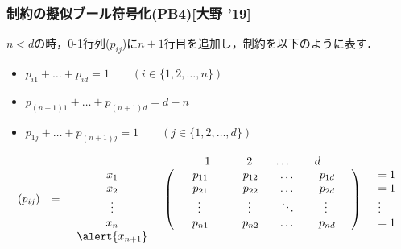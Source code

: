 \begin{frame}
    \frametitle{{\alldiff}制約の擬似ブール符号化(PB4)[大野 '19]}
    \begin{exampleblock}{}
        $n<d$の時，0-1行列($p_{ij}$)に$n+1$行目を追加し，{\alldifferent}制約を以下のように表す．
        \begin{itemize}
            \item $p_{i1} + \dots + p_{id} = 1 \qquad (i \in \{1,2,\ldots,n\})$
            \item $p_{(n+1)1} + \dots + p_{(n+1)d} = d-n$
            \item $p_{1j} + \dots + p_{(n+1)j} = 1 \qquad (j \in \{1,2,\ldots,d\})$
        \end{itemize}
        \begin{displaymath}
            \begin{array}{ccccc}
             & & & \begin{array}{cccc}  \;\;\;\;1\;\;\;\;&\;\;\;\;2\;\;\;\;&\dots&\;\;\;\;d\;\;\;\; \end{array}&\\
                (p_{ij})&=&
                \begin{array}{c}x_1\\ x_2\\ \vdots\\ x_n \end{array}&
                \left(
                    \begin{array}{cccc}
                        \;\;\;\;p_{11\;\;\;\;}&\;\;\;\;p_{12\;\;\;\;}&\dots&\;\;\;\;p_{1d\;\;\;\;}\\
                        \;\;\;\;p_{21\;\;\;\;}&\;\;\;\;p_{22\;\;\;\;}&\dots&\;\;\;\;p_{2d\;\;\;\;}\\
                        \;\;\;\;\vdots\;\;\;\;&\;\;\;\;\vdots\;\;\;\;&\ddots&\;\;\;\;\vdots\;\;\;\;\\
                        \;\;\;\;p_{n1\;\;\;\;}&\;\;\;\;p_{n2\;\;\;\;}&\dots&\;\;\;\;p_{nd\;\;\;\;}
                \end{array}\right)&
                \begin{array}{l} = 1\\ = 1\\ \vdots\\ = 1  \end{array}\\
                                                                    & & \begin{array}{c}\alert{x_{n+1}}\\ \\ \\ \end{array}& \begin{array}{cccc}  

\end{array}
\end{array}
\end{displaymath}
\end{exampleblock}
\end{frame}
